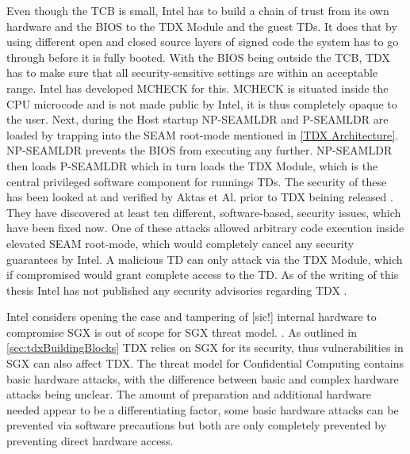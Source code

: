 Even though the TCB is small, Intel has to build a chain of trust from its own hardware and the BIOS to the TDX Module and the guest TDs. It does that by using different open and closed source layers of signed code the system has to go through before it is fully booted. With the BIOS being outside the TCB, TDX has to make sure that all security-sensitive settings are within an acceptable range. Intel has developed MCHECK for this. MCHECK is situated inside the CPU microcode and is not made public by Intel, it is thus completely opaque to the user. Next, during the Host startup NP-SEAMLDR and P-SEAMLDR are loaded by trapping into the SEAM root-mode mentioned in \cref{TDX Architecture}. NP-SEAMLDR prevents the BIOS from executing any further. NP-SEAMLDR then loads P-SEAMLDR which in turn loads the TDX Module, which is the central privileged software component for runnings TDs. The security of these has been looked at and verified by Aktas et Al. prior to TDX beining released \cite{aktas_intel_nodate}. They have discovered at least ten different, software-based, security issues, which have been fixed now. One of these attacks allowed arbitrary code execution inside elevated SEAM root-mode, which would completely cancel any security guarantees by Intel. A malicious TD can only attack via the TDX Module, which if compromised would grant complete access to the TD. As of the writing of this thesis Intel has not published any security advisories regarding TDX \cite{security_advisories}.


Intel considers \guillemotright opening the case and tampering of [sic!] internal hardware to compromise SGX is out of scope for SGX threat model. \guillemotleft \cite{chen_voltpillager_nodate}. As outlined in \cref{sec:tdxBuildingBlocks} TDX relies on SGX for its security, thus vulnerabilities in SGX can also affect TDX. The threat model for Confidential Computing contains basic hardware attacks, with the difference between basic and complex hardware attacks being unclear. The amount of preparation and additional hardware needed appear to be a differentiating factor, some basic hardware attacks can be prevented via software precautions but both are only completely prevented by preventing direct hardware access. 


